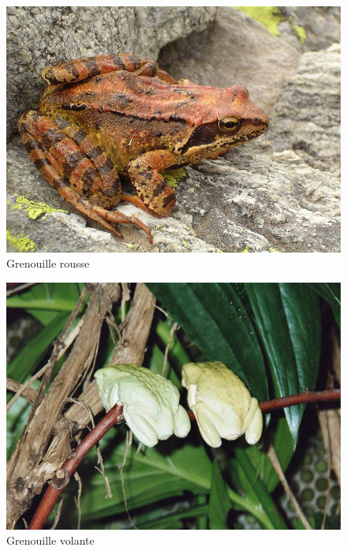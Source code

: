 \begin{figure}
 \begin{center}
 \includegraphics[scale=0.3]{Grenouille_rousse.jpg}
 \caption{Grenouille rousse}
 \end{center}
\end{figure}
 
\begin{figure}
 \begin{center}
  \includegraphics[scale=0.3]{grenouille_volante.jpg}
  \caption{Grenouille volante}
 \end{center}
\end{figure}

    
    

